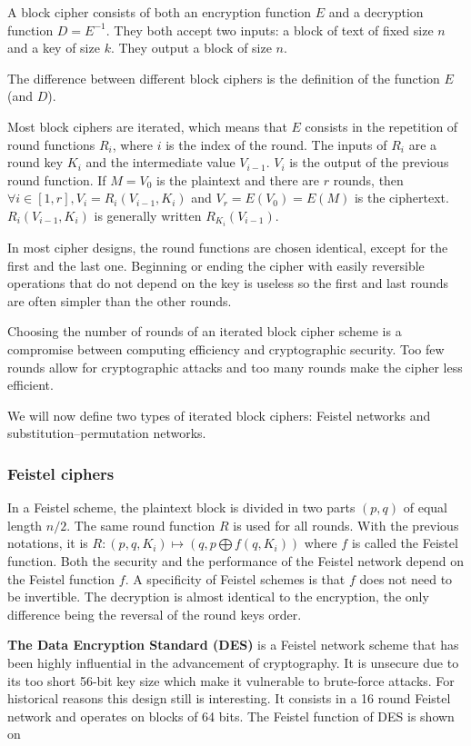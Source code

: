 \documentclass[11pt]{sdm}
\begin{document}
A block cipher consists of both an encryption function $E$ and a decryption function $D=E^{-1}$.
They both accept two inputs: a block of text of fixed size $n$ and a key of size $k$.
They output a block of size $n$.

The difference between different block ciphers is the definition of the function $E$ (and $D$).

Most block ciphers are iterated, which means that $E$ consists in the repetition of round functions $R_i$, where $i$ is the index of the round.
The inputs of $R_i$ are a round key $K_i$ and the intermediate value $V_{i-1}$.
$V_i$ is the output of the previous round function.
If $M=V_0$ is the plaintext and there are $r$ rounds, then $ \forall i \in [ 1,r ] , V_i = R_i(V_{i-1},K_i) $ and $V_r = E(V_0) = E(M)$ is the ciphertext.
$R_i(V_{i-1},K_i)$ is generally written $R_{K_i}(V_{i-1})$.

In most cipher designs, the round functions are chosen identical, except for the first and the last one.
Beginning or ending the cipher with easily reversible operations that do not depend on the key is useless so the first and last rounds are often simpler than the other rounds.

Choosing the number of rounds of an iterated block cipher scheme is a compromise between computing efficiency and cryptographic security.
Too few rounds allow for cryptographic attacks and too many rounds make the cipher less efficient.

We will now define two types of iterated block ciphers: Feistel networks and substitution–permutation networks.

\subsubsection{Feistel ciphers}

In a Feistel scheme, the plaintext block is divided in two parts $(p,q)$ of equal length $n/2$.
The same round function $R$ is used for all rounds.
With the previous notations, it is $R: (p,q, K_i) \mapsto (q,p \bigoplus f(q,K_i))$ where $f$ is called the Feistel function.
Both the security and the performance of the Feistel network depend on the Feistel function $f$.
A specificity of Feistel schemes is that $f$ does not need to be invertible.
The decryption is almost identical to the encryption, the only difference being the reversal of the round keys order.



\textbf{The Data Encryption Standard (DES)} is a Feistel network scheme that has been highly influential in the advancement of cryptography.
It is unsecure due to its too short 56-bit key size which make it vulnerable to brute-force attacks.
For historical reasons this design still is interesting.
It consists in a 16 round Feistel network and operates on blocks of 64 bits.
The Feistel function of DES is shown on %
\end{document}
